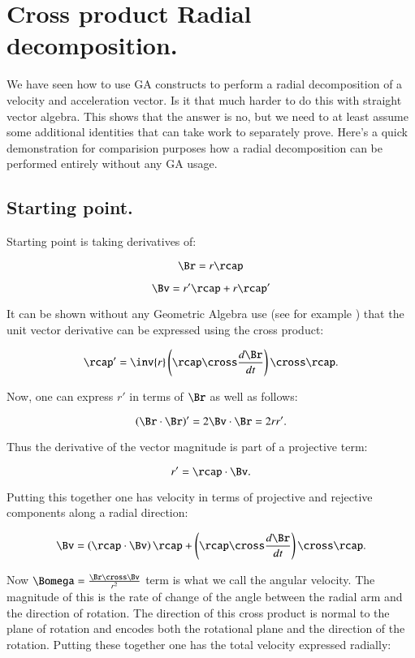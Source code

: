 \chapter{Cross product Radial decomposition.}\label{chap:PJAngAccCross}
\date{July 8, 2008.  $RCSfile: angularAccCross.tex,v $ Last $Revision: 1.11 $ $Date: 2009/06/18 03:31:04 $ }

We have seen how to use GA constructs to perform a radial 
decomposition of a velocity and acceleration vector.  Is it that
much harder to do this with straight vector algebra.  This shows that
the answer is no, but we need to at least assume some additional
identities that can take work to separately prove.  Here's a quick
demonstration for comparision purposes how a radial decomposition 
can be performed entirely without any GA usage.

\section{Starting point.}

Starting point is taking derivatives of:

\[
\Br = r \rcap
\]

\[
\Bv = r' \rcap + r \rcap'
\]

It can be shown without any Geometric Algebra use (see for example \cite{salas1990coa}) that the unit vector derivative can be expressed using the cross product:

\[
\rcap' = \inv{r} \left(\rcap \cross \frac{d\Br}{dt}\right) \cross \rcap.
\]

Now, one can express $r'$ in terms of $\Br$ as well as follows:

\[
\left(\Br \cdot \Br\right)' = 2 \Bv \cdot \Br = 2 r r'.
\]

Thus the derivative of the vector magnitude is part of a projective term:

\[
r' = \rcap \cdot \Bv.
\]

Putting this together one has velocity in terms of projective and rejective
components along a radial direction:

\[
\Bv = \left(\rcap \cdot \Bv\right) \rcap + \left(\rcap \cross \frac{d\Br}{dt}\right) \cross \rcap.
\]

Now $\Bomega = \frac{\Br \cross \Bv}{r^2}$ term is what we call the angular velocity.  The magnitude of this
is the rate of change of the angle between the radial arm and the direction of rotation.  The direction of this
cross product is normal to the plane of rotation and encodes both the rotational plane and the direction of the
rotation.  Putting these together one has the total velocity expressed radially:


